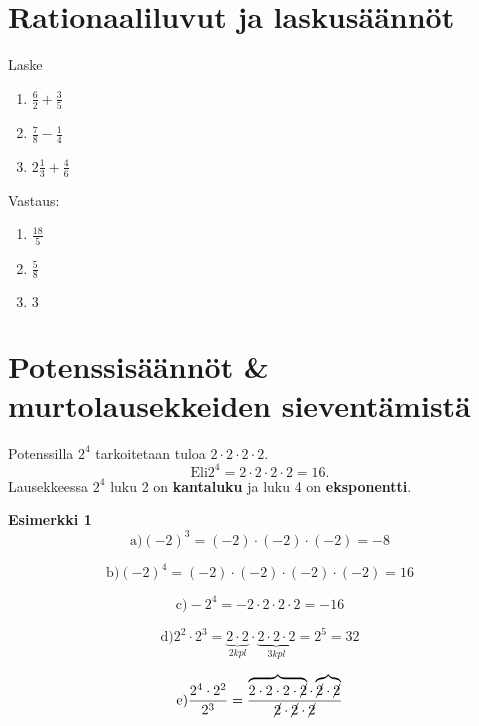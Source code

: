 \chapter{Rationaaliluvut ja laskusäännöt}

\begin{tehtava}
	Laske %
	\begin{enumerate}
	\item $\frac{6}{2} + \frac{3}{5}$
	\item $\frac{7}{8} - \frac{1}{4}$
	\item $2 \frac{1}{3} + \frac{4}{6}$	
	\end{enumerate}
	
	\begin{vastaus}
	Vastaus:
	\begin{enumerate}
		\item $\frac{18}{5}$
		\item $\frac{5}{8}$
		\item $3$
	\end{enumerate}			
	\end{vastaus}
\end{tehtava}

\chapter{Potenssisäännöt \& murtolausekkeiden sieventämistä}
Potenssilla $2^4$ tarkoitetaan tuloa $2\cdot 2\cdot 2\cdot 2$.
\begin{equation}
\text{Eli} 2^4=2\cdot 2\cdot 2\cdot 2=16.
\end{equation}
Lausekkeessa $2^4$ luku 2 on \textbf{kantaluku} ja luku 4 on \textbf{eksponentti}.

\begin{esimerkki}
\textbf{Esimerkki 1}
\begin{equation}
\text{a)} (-2)^3=(-2)\cdot (-2)\cdot (-2)=-8
\end{equation}

\begin{equation}
\text{b)} (-2)^4=(-2)\cdot (-2)\cdot (-2)\cdot (-2)=16
\end{equation}

\begin{equation}
\text{c)} -2^4=-2\cdot 2\cdot 2\cdot 2=-16
\end{equation}

\begin{equation}
\text{d)} 2^2\cdot 2^3=\underbrace{2\cdot 2}_{2 kpl}\cdot \underbrace{2\cdot 2\cdot 2}_{3 kpl}=2^5=32
\end{equation}

\begin{equation}
\text{e)}\frac{2^4\cdot 2^2}{2^3}=\frac{\overbrace{2\cdot 2\cdot 2\cdot \cancel{2}}\cdot \overbrace{\cancel{2}\cdot \cancel{2}}}{\cancel{2}\cdot \cancel{2}\cdot \cancel{2}}
\end{equation}
\end{esimerkki}

